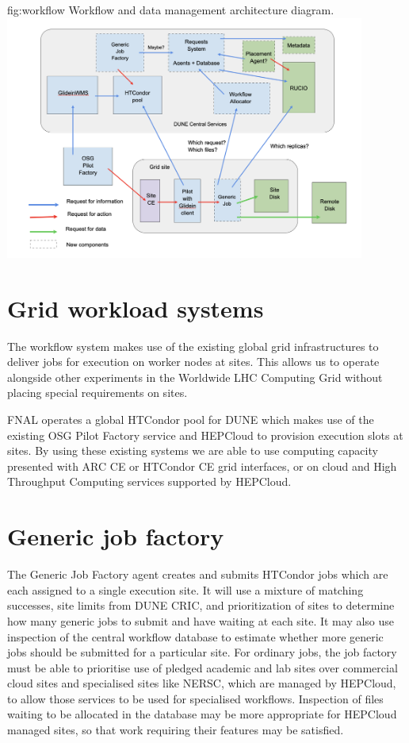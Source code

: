 \documentclass[../main-v1.tex]{subfiles}
\begin{document}
\begin{dunefigure}
{fig:workflow} 
{Workflow and data management architecture diagram.}
\includegraphics[height=8cm]{graphics/Workflow/wfs.png}
\end{dunefigure}

\section{Grid workload systems}
\label{sec:flow:grid}

The workflow system makes use of the existing global grid infrastructures to deliver jobs for execution on worker nodes at sites. This allows us to operate alongside other experiments in the Worldwide LHC Computing Grid without placing special requirements on sites.

FNAL operates a global HTCondor pool for DUNE which makes use of the existing OSG Pilot Factory service and HEPCloud to provision execution slots at sites. By using these existing systems we are able to use computing capacity presented with ARC CE or HTCondor CE grid interfaces, or on cloud and High Throughput Computing services supported by HEPCloud.

\section{Generic job factory}
\label{sec:flow:factory}

The Generic Job Factory agent creates and submits HTCondor jobs which are each assigned to a single execution site. It will use a mixture of matching successes, site limits from DUNE CRIC, and prioritization of sites to determine how many generic jobs to submit and have waiting at each site. It may also use inspection of the central workflow database to estimate whether more generic jobs should be submitted for a particular site. For ordinary jobs, the job factory must be able to prioritise use of pledged academic and lab sites over commercial cloud sites and specialised sites like NERSC, which are managed by HEPCloud, to allow those services to be used for specialised workflows. Inspection of files waiting to be allocated in the database may be more appropriate for HEPCloud managed sites, so that work requiring their features may be satisfied.
\end{document}
